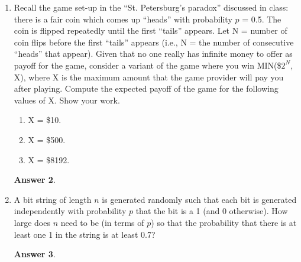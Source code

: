 \documentclass[12pt]{article}
\renewcommand{\(}{\left(}
\renewcommand{\)}{\right)}
\theoremstyle{definition}
\newtheorem*{answer}{Answer}
\begin{document}
\begin{enumerate}
\begin{shaded}
\begin{answer}
    \end{answer}
    \end{shaded}
    \pagebreak
    \item Recall the game set-up in the ``St. Petersburg's paradox'' discussed in class: there is a fair coin which comes up ``heads'' with probability $p$ = 0.5. The coin is flipped repeatedly until the first ``tails'' appears. Let N = number of coin flips before the first ``tails'' appears (i.e., N = the number of consecutive ``heads'' that appear). Given that no one really has infinite money to offer as payoff for the game, consider a variant of the game where you win MIN(\$$2^N$, X), where X is the maximum amount that the game provider will pay you after playing. Compute the expected payoff of the game for the following values of X. Show your work.
    \begin{enumerate}
        \item X = \$10.
        \item X = \$500.
        \item X = \$8192.
    \end{enumerate}
    
    \begin{shaded}
    \begin{answer}
    
    \end{answer}
    \end{shaded}
    \pagebreak
    \item A bit string of length $n$ is generated randomly such that each bit is generated independently with probability $p$ that the bit is a 1 (and 0 otherwise). How large does $n$ need to be (in terms of $p$) so that the probability that there is at least one 1 in the string is at least 0.7?
    
    \begin{shaded}
    \begin{answer}
    

\end{answer}
\end{shaded}
\end{enumerate}
\end{document}
